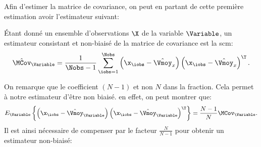 Afin d'estimer la matrice de covariance, on peut en partant de cette première estimation avoir l'estimateur suivant:

\begin{proposition}
  \'Etant donné un ensemble d'observations $\X$ de la variable $\Variable$, un estimateur consistant et non-biaisé de la matrice de covariance est la scm:
  \begin{equation}
    \hat{\MCov}_\Variable =  \frac{1}{\Nobs-1}\sum_{\iobs=1}^{\Nobs} \left(\x_\iobs-\hat{\Vmoy}_x\right)\left(\x_\iobs-\hat{\Vmoy}_x\right)^\T.
    \label{eq:context-estimation-covariance}
  \end{equation}
\end{proposition}


\begin{remark}
  On remarque que le coefficient $(N-1)$ et non $N$ dans la fraction. Cela permet à notre estimateur d'être non biaisé. en effet, on peut montrer que:
$$
  E_\Variable\left\{\left(\x_\iobs-\hat{\Vmoy}_\Variable\right)\left(\x_\iobs-\hat{\Vmoy}_\Variable\right)^\T\right\} = \frac{N-1}{N}\MCov_\Variable.
$$
Il est ainsi nécessaire de compenser par le facteur $\frac{N}{N-1}$ pour obtenir un estimateur non-biaisé:



\end{remark}
